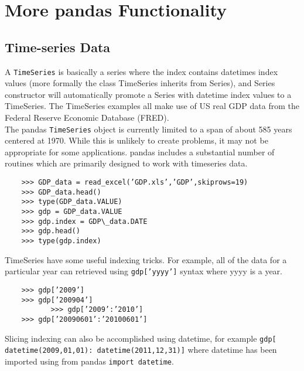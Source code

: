\documentclass[KSmain.tex]{subfiles}
\begin{document}
 
\section{More pandas Functionality}	
\subsection{Time-series Data}
A \texttt{TimeSeries} is basically a series where the index contains datetimes index values (more formally
	the class TimeSeries inherits from Series), and Series constructor will automatically promote a Series
	with datetime index values to a TimeSeries. The TimeSeries examples all make use of US real GDP data
	from the Federal Reserve Economic Database (FRED).\\

	
\noindent The pandas \texttt{TimeSeries} object is currently limited to a span of about 585 years centered at 1970. While this
		is unlikely to create problems, it may not be appropriate for some applications.
		pandas includes a substantial number of routines which are primarily designed to work with timeseries
		data. 
\begin{framed}
\begin{verbatim}
	>>> GDP_data = read_excel(’GDP.xls’,’GDP’,skiprows=19)
	>>> GDP_data.head()
	>>> type(GDP_data.VALUE)
	>>> gdp = GDP_data.VALUE
	>>> gdp.index = GDP\_data.DATE
	>>> gdp.head()
	>>> type(gdp.index)
	\end{verbatim}
\end{framed}
TimeSeries have some useful indexing tricks. For example, all of the data for a particular year can retrieved
	using \texttt{gdp[’yyyy’]} syntax where yyyy is a year.
	
\begin{framed}
\begin{verbatim}
	>>> gdp[’2009’]
	>>> gdp[’200904’]
           >>> gdp[’2009’:’2010’]
	>>> gdp[’20090601’:’20100601’]
\end{verbatim}
	\end{framed}
	Slicing indexing can also be accomplished using datetime, for example \texttt{gdp[ datetime(2009,01,01): datetime(2011,12,31)]}
	where datetime has been imported using from pandas \texttt{import datetime}.
\end{document}
